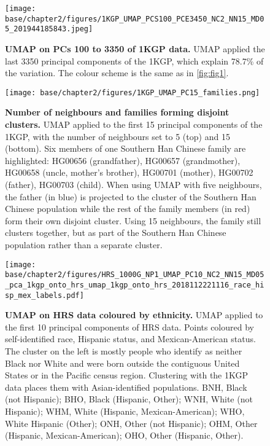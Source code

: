 \newpage

\begin{figure}[ht]
    \centering
    \texttt{[image: base/chapter2/figures/1KGP\_UMAP\_PCS100\_PCE3450\_NC2\_NN15\_MD05\_201944185843.jpeg]}
    \caption[UMAP on PCs 100 to 3350 of 1KGP data]{\textbf{UMAP on PCs 100 to 3350 of 1KGP data.} UMAP applied the last 3350 principal components of the 1KGP, which explain 78.7\% of the variation. The colour scheme is the same as in \ref{fig:fig1}.}
    \label{fig:supp_1kgp_3350}
\end{figure}

\newpage

\begin{figure}[ht]
    \centering
    \texttt{[image: base/chapter2/figures/1KGP\_UMAP\_PC15\_families.png]}
    \caption[Number of neighbours and families forming disjoint clusters]{\textbf{Number of neighbours and families forming disjoint clusters.} UMAP applied to the first 15 principal components of the 1KGP, with the number of neighbours set to 5 (top) and 15 (bottom). Six members of one Southern Han Chinese family are highlighted: HG00656 (grandfather), HG00657 (grandmother), HG00658 (uncle, mother's brother), HG00701 (mother), HG00702 (father), HG00703 (child). When using UMAP with five neighbours, the father (in blue) is projected to the cluster of the Southern Han Chinese population while the rest of the family members (in red) form their own disjoint cluster. Using 15 neighbours, the family still clusters together, but as part of the Southern Han Chinese population rather than a separate cluster.}
    \label{fig:supp_1kgp_families}
\end{figure}

\newpage

\begin{figure}[ht]
    \centering
    \texttt{[image: base/chapter2/figures/HRS\_1000G\_NP1\_UMAP\_PC10\_NC2\_NN15\_MD05\_pca\_1kgp\_onto\_hrs\_umap\_1kgp\_onto\_hrs\_2018112221116\_race\_hisp\_mex\_labels.pdf]}
    \caption[UMAP on HRS data coloured by ethnicity]{\textbf{UMAP on HRS data coloured by ethnicity.} UMAP applied to the first 10 principal components of HRS data. Points coloured by self-identified race, Hispanic status, and Mexican-American status. The cluster on the left is mostly people who identify as neither Black nor White and were born outside the contiguous United States or in the Pacific census region. Clustering with the 1KGP data places them with Asian-identified populations. BNH, Black (not Hispanic); BHO, Black (Hispanic, Other); WNH, White (not Hispanic); WHM, White (Hispanic, Mexican-American); WHO, White Hispanic (Other); ONH, Other (not Hispanic); OHM, Other (Hispanic, Mexican-American); OHO, Other (Hispanic, Other).}
    \label{fig:supp_umap_hrs_eth}
\end{figure}

